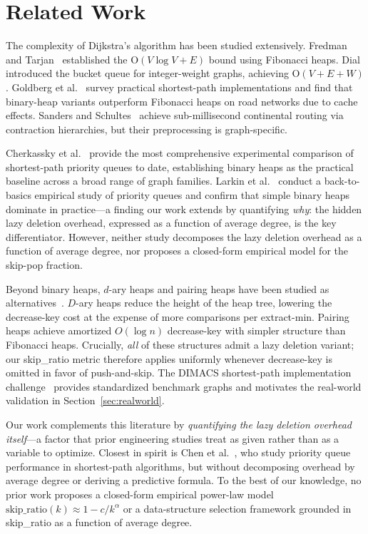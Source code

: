 \documentclass[conference]{IEEEtran}
\begin{document}
\section{Related Work}
\label{sec:related}

The complexity of Dijkstra's algorithm has been studied extensively.
Fredman and Tarjan~\cite{fredman1987} established the O$(V\log V + E)$
bound using Fibonacci heaps.  Dial~\cite{dial1969} introduced the bucket
queue for integer-weight graphs, achieving O$(V + E + W)$.
Goldberg et al.~\cite{goldberg2005} survey practical shortest-path
implementations and find that binary-heap variants outperform Fibonacci
heaps on road networks due to cache effects.  Sanders and
Schultes~\cite{sanders2005} achieve sub-millisecond continental routing via
contraction hierarchies, but their preprocessing is graph-specific.

Cherkassky et al.~\cite{cherkassky1996} provide the most comprehensive
experimental comparison of shortest-path priority queues to date,
establishing binary heaps as the practical baseline across a broad range of
graph families.  Larkin et al.~\cite{larkin2014} conduct a back-to-basics
empirical study of priority queues and confirm that simple binary heaps
dominate in practice---a finding our work extends by quantifying \emph{why}:
the hidden lazy deletion overhead, expressed as a function of average degree,
is the key differentiator.  However, neither study decomposes the lazy
deletion overhead as a function of average degree, nor proposes a
closed-form empirical model for the skip-pop fraction.

Beyond binary heaps, $d$-ary heaps and pairing heaps have been studied as
alternatives~\cite{ahuja1993}.  $D$-ary heaps reduce the height of the heap
tree, lowering the decrease-key cost at the expense of more comparisons per
extract-min.  Pairing heaps achieve amortized $O(\log n)$ decrease-key with
simpler structure than Fibonacci heaps.  Crucially, \emph{all} of these
structures admit a lazy deletion variant; our skip\_ratio metric therefore
applies uniformly whenever decrease-key is omitted in favor of push-and-skip.
The DIMACS shortest-path implementation challenge~\cite{demetrescu2006}
provides standardized benchmark graphs and motivates the real-world
validation in Section~\ref{sec:realworld}.

Our work complements this literature by \emph{quantifying the lazy deletion
overhead itself}---a factor that prior engineering studies treat as given
rather than as a variable to optimize.  Closest in spirit is Chen
et al.~\cite{chen2007}, who study priority queue performance in shortest-path
algorithms, but without decomposing overhead by average degree or deriving a
predictive formula.  To the best of our knowledge, no prior work proposes a closed-form
empirical power-law model $\text{skip\_ratio}(k)\approx 1-c/k^{\alpha}$
or a data-structure selection framework grounded in skip\_ratio as a
function of average degree.
\end{document}
